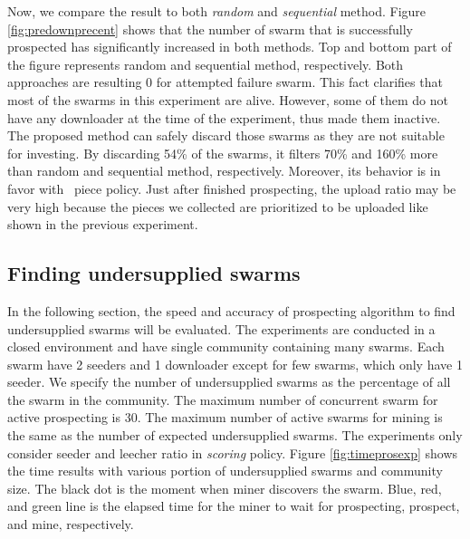 Now, we compare the result to both \textit{random} and \textit{sequential} method. Figure \ref{fig:predownprecent} shows that the number of swarm that is successfully prospected has significantly increased in both methods. Top and bottom part of the figure represents random and sequential method, respectively. Both approaches are resulting 0 for attempted failure swarm. This fact clarifies that most of the swarms in this experiment are alive. However, some of them do not have any downloader at the time of the experiment, thus made them inactive. The proposed method can safely discard those swarms as they are not suitable for investing. By discarding 54\% of the swarms, it filters 70\% and 160\% more than random and sequential method, respectively. Moreover, its behavior is in favor with \bt~piece policy. Just after finished prospecting, the upload ratio may be very high because the pieces we collected are prioritized to be uploaded like shown in the previous experiment.

\subsection{Finding undersupplied swarms}
In the following section, the speed and accuracy of prospecting algorithm to find undersupplied swarms will be evaluated. The experiments are conducted in a closed environment and have single community containing many swarms. Each swarm have 2 seeders and 1 downloader except for few swarms, which only have 1 seeder. We specify the number of undersupplied swarms as the percentage of all the swarm in the community. The maximum number of concurrent swarm for active prospecting is 30. The maximum number of active swarms for mining is the same as the number of expected undersupplied swarms. The experiments only consider seeder and leecher ratio in \textit{scoring} policy. Figure \ref{fig:timeprosexp} shows the time results with various portion of undersupplied swarms and community size. The black dot is the moment when miner discovers the swarm. Blue, red, and green line is the elapsed time for the miner to wait for prospecting, prospect, and mine, respectively.


